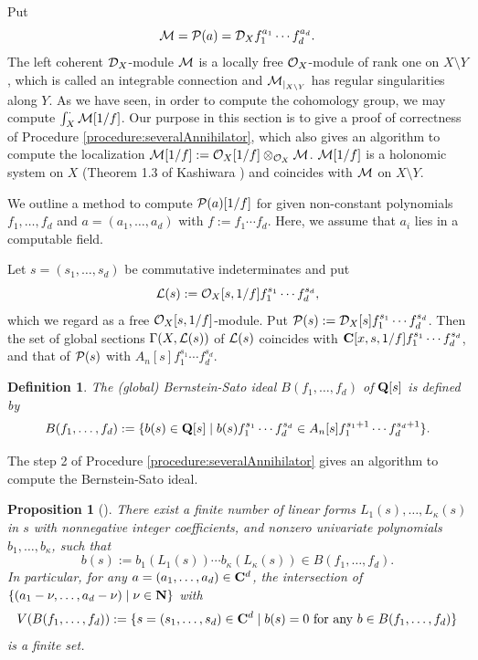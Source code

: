 \documentclass[12pt]{article}
\def\C{{\bf C}}
\def\N{ {\bf N} }
\def\Q{{\bf Q}}
\def\V{ V }
\def\Dsc{ {\cal D} }
\def\Lsc{ {\cal L} }
\def\Msc{ {\cal M} }
\def\Osc{ {\cal O} }
\def\Psc{ {\cal P} }
\newtheorem{definition}[theorem]{Definition}
\newtheorem{proposition}[theorem]{Proposition}
\begin{document}
Put
$$
\Msc = \Psc(a) = 
 \Dsc_X f_1^{a_1}\cdots f_d^{a_d}.
$$
The left coherent $\Dsc_X$-module
$\Msc$ is a locally free $\Osc_X$-module of rank one
on $X\setminus Y$,
which is called an integrable connection and $\Msc_{|_{X \setminus Y}}$
has regular singularities along $Y$.    
As we have seen,
in order to compute the cohomology group, we may compute
$\int_X^{\cdot} \Msc[1/f]$.
Our purpose in this section is to give a proof of correctness of
Procedure \ref{procedure:severalAnnihilator}, which also gives
an algorithm to compute the localization 
$\Msc[1/f]:= \Osc_X[1/f]\otimes_{\Osc_X}\Msc$.
$\Msc[1/f]$ is 
a holonomic system on $X$ (Theorem 1.3 of Kashiwara \cite{K1}) 
and coincides with $\Msc$ on $X\setminus Y$. 


We outline a method to compute $\Psc(a)[1/f]$ for given 
non-constant polynomials $f_1,\dots,f_d$ and $a = (a_1,\dots,a_d)$ 
with $f := f_1\cdots f_d$.  
Here, we assume that $a_i$ lies in a computable field.

Let $s = (s_1,\dots,s_d)$ be commutative indeterminates and put
$$ \Lsc(s) := \Osc_X[s,1/f]f_1^{s_1}\cdots f_d^{s_d},$$
which we regard as a free $\Osc_X[s,1/f]$-module.
Put $\Psc(s) := \Dsc_X[s]f_1^{s_1}\cdots f_d^{s_d}$.  
Then the set of global sections $\Gamma(X,\Lsc(s))$ of $\Lsc(s)$ coincides 
with $\C[x,s,1/f]f_1^{s_1}\cdots f_d^{s_d}$, and that of $\Psc(s)$ with
$ A_n[s]f_1^{s_1}\cdots f_d^{s_d}$. 

\begin{definition}{\rm
The (global) Bernstein-Sato ideal $B(f_1,\dots,f_d)$ of $\Q[s]$ is defined by
$$
B(f_1,\dots,f_d) := \{ b(s) \in \Q[s] \mid 
b(s)f_1^{s_1}\cdots f_d^{s_d} \in 
A_n[s]f_1^{s_1+1}\cdots f_d^{s_d+1}\}.
$$
}
\end{definition}

The step 2 of Procedure \ref{procedure:severalAnnihilator} gives
an algorithm to compute the Bernstein-Sato ideal.

\begin{proposition}[\cite{S}]
\label{proposition:sabbahBfunction}
There exist a finite number of linear forms $L_1(s),\dots,L_\kappa(s)$ 
in $s$ with nonnegative integer coefficients, and nonzero 
univariate polynomials $b_1,\dots,b_\kappa$, such that
$$ 
b(s) := b_1(L_1(s))\cdots b_\kappa(L_\kappa(s)) \in B(f_1,\dots,f_d).
$$
In particular, for any $a = (a_1,\dots,a_d) \in \C^d$, 
the intersection of $\{(a_1-\nu,\dots,a_d-\nu) \mid \nu\in\N\}$ with
$$
\V(B(f_1,\dots,f_d)) := \{s = (s_1,\dots,s_d) \in \C^d \mid
b(s) = 0 \mbox{ for any $b \in B(f_1,\dots,f_d)$}\}
$$
is a finite set.  
\end{proposition}
\end{document}
